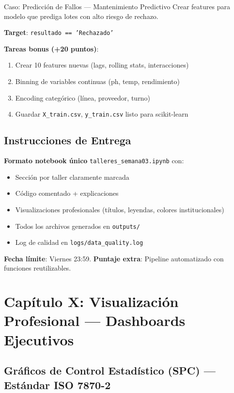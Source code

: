 \documentclass[11pt, a4paper]{article}
\begin{document}
\begin{industrybox}{Caso: Predicción de Fallos — Mantenimiento Predictivo}
Crear features para modelo que prediga lotes con alto riesgo de rechazo.

\textbf{Target}: \texttt{resultado == 'Rechazado'}
\end{industrybox}

\textbf{Tareas bonus (+20 puntos)}:
\begin{enumerate}
    \item Crear 10 features nuevas (lags, rolling stats, interacciones)
    \item Binning de variables continuas (ph, temp, rendimiento)
    \item Encoding categórico (línea, proveedor, turno)
    \item Guardar \texttt{X\_train.csv}, \texttt{y\_train.csv} listo para scikit-learn
\end{enumerate}

\subsection{Instrucciones de Entrega}

\textbf{Formato notebook único} \texttt{talleres\_semana03.ipynb} con:
\begin{itemize}
    \item Sección por taller claramente marcada
    \item Código comentado + explicaciones
    \item Visualizaciones profesionales (títulos, leyendas, colores institucionales)
    \item Todos los archivos generados en \texttt{outputs/}
    \item Log de calidad en \verb|logs/data_quality.log|
\end{itemize}

\textbf{Fecha límite}: Viernes 23:59. \textbf{Puntaje extra}: Pipeline automatizado con funciones reutilizables.

\newpage
\section{Capítulo X: Visualización Profesional --- Dashboards Ejecutivos}

\subsection{Gráficos de Control Estadístico (SPC) --- Estándar ISO 7870-2}
\end{document}

